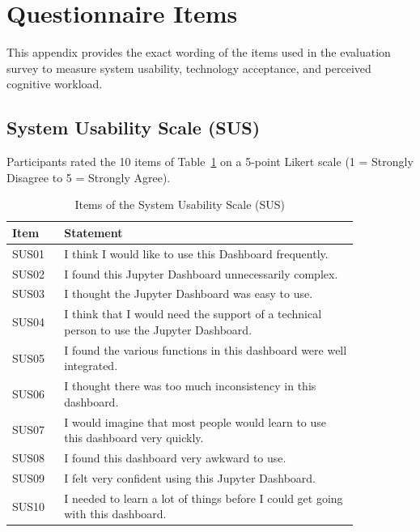 \documentclass[acmsmall]{acmart}
\begin{document}
\appendix
{}

\section{Questionnaire Items}
\label{sec:appendix_questionnaires}
This appendix provides the exact wording of the items used in the evaluation survey to measure system usability, technology acceptance, and perceived cognitive workload.

\subsection{System Usability Scale (SUS)}
Participants rated the 10 items of Table~\ref{tab:app_sus} on a 5-point Likert scale (1 = Strongly Disagree to 5 = Strongly Agree). 

\begin{table}[htpb]
  \centering
  \caption{Items of the System Usability Scale (SUS)}
  \label{tab:app_sus}
  \begin{tabular}{lp{0.85\linewidth}}
    \toprule
    \textbf{Item} & \textbf{Statement} \\
    \midrule
    SUS01 & I think I would like to use this Dashboard frequently. \\
    SUS02 & I found this Jupyter Dashboard unnecessarily complex. \\
    SUS03 & I thought the Jupyter Dashboard was easy to use. \\
    SUS04 & I think that I would need the support of a technical person to use the Jupyter Dashboard. \\
    SUS05 & I found the various functions in this dashboard were well integrated. \\
    SUS06 & I thought there was too much inconsistency in this dashboard. \\
    SUS07 & I would imagine that most people would learn to use this dashboard very quickly. \\
    SUS08 & I found this dashboard very awkward to use. \\
    SUS09 & I felt very confident using this Jupyter Dashboard. \\
    SUS10 & I needed to learn a lot of things before I could get going with this dashboard. \\
    \bottomrule
  \end{tabular}
\end{table}
\end{document}
